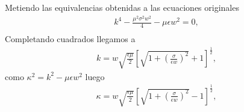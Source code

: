 Metiendo las equivalencias obtenidas a las ecuaciones originales 
\begin{subequations}
	\begin{eqnarray}
	k^4 - \frac{\mu^2 \sigma^2 w^2}{4} - \mu \epsilon w^2=0 \nonumber,\\
	\end{eqnarray}
\end{subequations}
Completando cuadrados llegamos a 
\begin{subequations}
	\begin{eqnarray}
	k= w \sqrt{\frac{\epsilon \mu}{2}} \left[\sqrt{1+\left(\frac{\sigma}{\epsilon w} \right)^2}+1 \right]^\frac{1}{2},
	\end{eqnarray}
\end{subequations}
como $\kappa^2 = k^2 - \mu \epsilon w^2$ luego
\begin{subequations}
	\begin{eqnarray}
	\kappa = w \sqrt{\frac{\epsilon \mu}{2}} \left[\sqrt{1 + \left(\frac{\sigma}{\epsilon w} \right)^2}-1\right]^\frac{1}{2},
	\end{eqnarray}
\end{subequations}